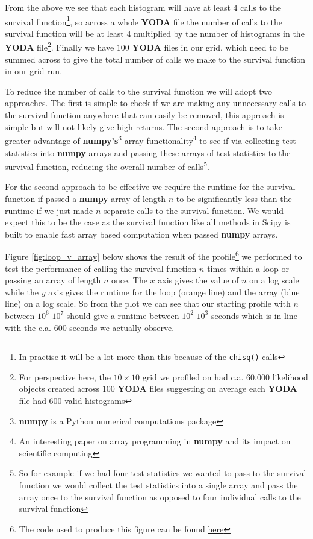 From the above we see that each histogram will have at least $4$ calls to the survival function\footnote{In practise it will be a lot more than this because of the \texttt{chisq()} calls}, so across a whole \textbf{YODA} file the number of calls to the survival function will be at least $4$ multiplied by the number of histograms in the \textbf{YODA} file\footnote{For perspective here, the $10\times 10$ grid we profiled on had c.a. 60,000 likelihood objects created across $100$ \textbf{YODA} files suggesting on average each \textbf{YODA} file had $600$ valid histograms}. Finally we have $100$ \textbf{YODA} files in our grid, which need to be summed across to give the total number of calls we make to the survival function in our grid run.

To reduce the number of calls to the survival function we will adopt two approaches. The first is simple to check if we are making any unnecessary calls to the survival function anywhere that can easily be removed, this approach is simple but will not likely give high returns. The second approach is to take greater advantage of \textbf{numpy's}\footnote{\textbf{numpy} is a Python numerical computations package\cite{numpy}} array functionality\footnote{An interesting paper on array programming in \textbf{numpy} and its impact on scientific computing\cite{numpy_array}} to see if via collecting test statistics into \textbf{numpy} arrays and passing these arrays of test statistics to the survival function, reducing the overall number of calls\footnote{So for example if we had four test statistics we wanted to pass to the survival function we would collect the test statistics into a single array and pass the array once to the survival function as opposed to four individual calls to the survival function}.

For the second approach to be effective we require the runtime for the survival function if passed a \textbf{numpy} array of length $n$ to be significantly less than the runtime if we just made $n$ separate calls to the survival function. We would expect this to be the case as the survival function like all methods in Scipy is built to enable fast array based computation when passed \textbf{numpy} arrays. 

Figure \ref{fig:loop_v_array} below shows the result of the profile\footnote{The code used to produce this figure can be found \href{https://github.com/SeanBrayUCL/contur_thesis/tree/main/profiling_code}{here}} we performed to test the performance of calling the survival function $n$ times within a loop or passing an array of length $n$ once. The $x$ axis gives the value of $n$ on a log scale while the $y$ axis gives the runtime for the loop (orange line) and the array (blue line) on a log scale. So from the plot we can see that our starting profile with $n$ between $10^6$-$10^7$ should give a runtime between $10^2$-$10^3$ seconds which is in line with the c.a. $600$ seconds we actually observe.

